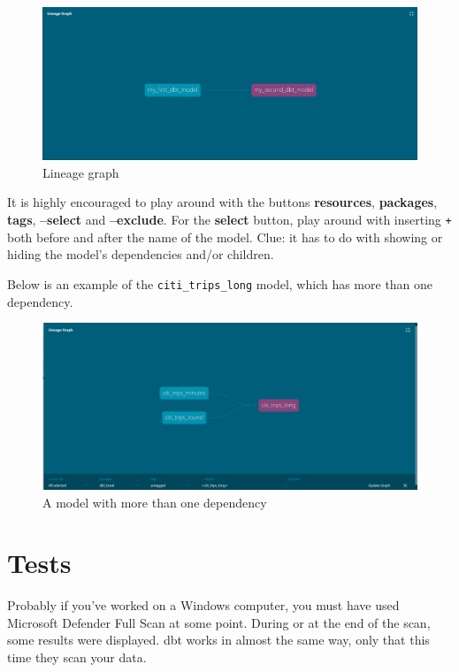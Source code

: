 \documentclass[
]{book}
\begin{document}
\begin{figure}
\centering
\includegraphics{./images/lineage_graph.png}
\caption{Lineage graph}
\end{figure}

It is highly encouraged to play around with the buttons \textbf{resources}, \textbf{packages}, \textbf{tags}, \textbf{--select} and \textbf{--exclude}. For the \textbf{select} button, play around with inserting \texttt{+} both before and after the name of the model. Clue: it has to do with showing or hiding the model's dependencies and/or children.

Below is an example of the \texttt{citi\_trips\_long} model, which has more than one dependency.

\begin{figure}
\centering
\includegraphics{./images/lineage_graph2.png}
\caption{A model with more than one dependency}
\end{figure}

\hypertarget{tests-1}{%
\chapter{Tests}\label{tests-1}}

Probably if you've worked on a Windows computer, you must have used Microsoft Defender Full Scan at some point. During or at the end of the scan, some results were displayed. dbt works in almost the same way, only that this time they scan your data.
\end{document}
